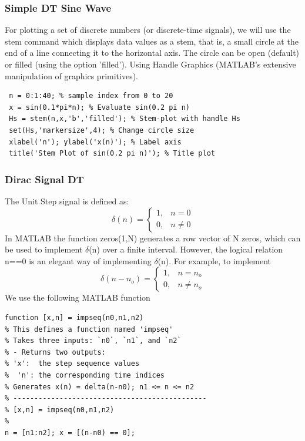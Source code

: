 \documentclass{article}
\begin{document}
\subsubsection{Simple DT Sine Wave}
For plotting a set of discrete numbers (or discrete-time signals), we
will use the stem command which displays data values as a stem, that
is, a small circle at the end of a line connecting it to the horizontal axis.
The circle can be open (default) or filled (using the option 'filled').
Using Handle Graphics (MATLAB's extensive manipulation of graphics
primitives).
\begin{lstlisting}
 n = 0:1:40; % sample index from 0 to 20
 x = sin(0.1*pi*n); % Evaluate sin(0.2 pi n)
 Hs = stem(n,x,'b','filled'); % Stem-plot with handle Hs
 set(Hs,'markersize',4); % Change circle size
 xlabel('n'); ylabel('x(n)'); % Label axis
 title('Stem Plot of sin(0.2 pi n)'); % Title plot    
\end{lstlisting}
\subsubsection{Dirac Signal DT}
The Unit Step signal is defined as: \\
\begin{equation}
\delta(n) = \begin{cases}
1 , &  n = 0 \\
0, & n\neq 0
\end{cases}
\end{equation}
In MATLAB the function zeros(1,N) generates a row vector of N
zeros, which can be used to implement $\delta$(n) over a finite interval. However, the logical relation n==0 is an elegant way of implementing $\delta$(n).
For example, to implement
\begin{equation}
\delta(n-n_o) = \begin{cases}
1 , &  n = n_o \\
0, & n\neq n_o
\end{cases}
\end{equation}
We use the following MATLAB function \\
\begin{lstlisting}
function [x,n] = impseq(n0,n1,n2)
% This defines a function named 'impseq' 
% Takes three inputs: `n0`, `n1`, and `n2`
% - Returns two outputs: 
% 'x':  the step sequence values  
%  'n': the corresponding time indices
% Generates x(n) = delta(n-n0); n1 <= n <= n2
% ----------------------------------------------
% [x,n] = impseq(n0,n1,n2)
%
n = [n1:n2]; x = [(n-n0) == 0];    
\end{lstlisting}
\end{document}

